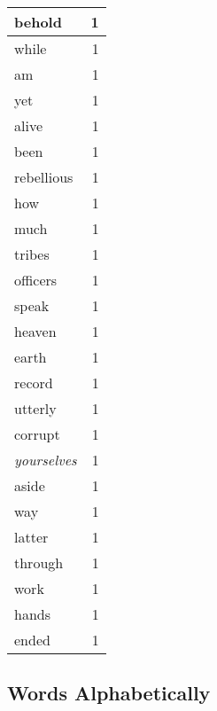 \begin{center}
\begin{longtable}{l|r}
behold & 1 \\ \hline
while & 1 \\ \hline
am & 1 \\ \hline
yet & 1 \\ \hline
alive & 1 \\ \hline
been & 1 \\ \hline
rebellious & 1 \\ \hline
how & 1 \\ \hline
much & 1 \\ \hline
tribes & 1 \\ \hline
officers & 1 \\ \hline
speak & 1 \\ \hline
heaven & 1 \\ \hline
earth & 1 \\ \hline
record & 1 \\ \hline
utterly & 1 \\ \hline
corrupt & 1 \\ \hline
\emph{yourselves} & 1 \\ \hline
aside & 1 \\ \hline
way & 1 \\ \hline
latter & 1 \\ \hline
through & 1 \\ \hline
work & 1 \\ \hline
hands & 1 \\ \hline
ended & 1 \\ \hline
\end{longtable}
\end{center}



\normalsize



\subsection{Words Alphabetically}

